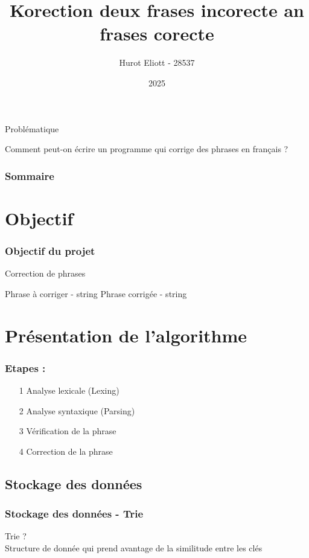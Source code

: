\documentclass{beamer}
\title{Korection deux frases incorecte an frases corecte}
\author{Hurot Eliott - 28537}
\date{2025}
\begin{document}

\frame{\titlepage}

\begin{frame}{Problématique}
   \begin{center}
      \huge{Comment peut-on écrire un programme qui corrige des phrases en français ?}
   \end{center}
\end{frame}

\begin{frame}
   \frametitle{Sommaire}
   \tableofcontents
\end{frame}

\section{Objectif}
\begin{frame}
   \frametitle{Objectif du projet}
   \begin{algorithm}[H]
      \caption{Correction de phrases}
      \begin{algorithmic}
         \Require Phrase à corriger - string
         \Ensure Phrase corrigée - string
      \end{algorithmic}
   \end{algorithm}
\end{frame}

\section{Présentation de l'algorithme}
\begin{frame}
   \frametitle{Etapes :}
   \begin{enumerate}
      \item[\Large{1}] \Large{Analyse lexicale (Lexing)}
      \item[2] \Large{Analyse syntaxique (Parsing)}
      \item[3] \Large{Vérification de la phrase}
      \item[4] \Large{Correction de la phrase}
   \end{enumerate}
\end{frame}

\subsection{Stockage des données}
\begin{frame}
   \frametitle{Stockage des données - Trie}
   \Large{Trie ?}\\
   \Large{Structure de donnée qui prend avantage de la similitude entre les clés}
\end{frame}
\end{document}
